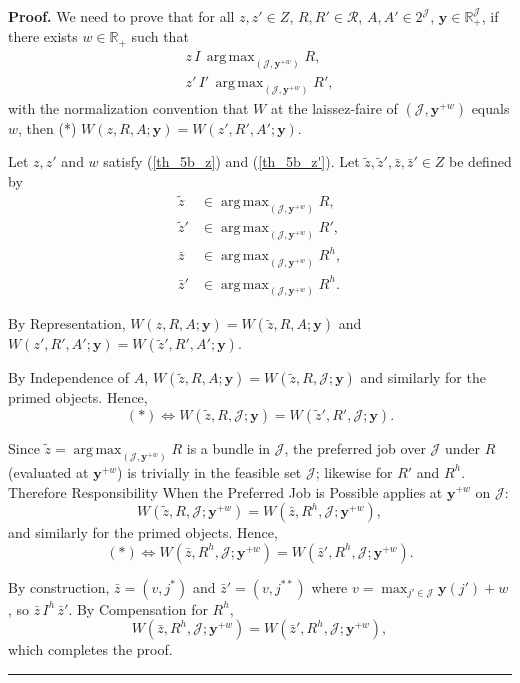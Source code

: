 \documentclass[12pt,thmsb]{article}
\DeclareMathOperator*{\argmax}{arg\,max}
\newenvironment{proof}[1][Proof]{\noindent \textbf{#1.} }{\  \rule{0.5em}{0.5em}}
\begin{document}
\begin{proof}
We need to prove that for all $z,z'\in Z$, $R,R'\in\mathcal{R}$, $A,A'\in 2^{\mathcal{J}}$, $\mathbf y\in\mathbb{R}_{+}^{\mathcal{J}}$, if there exists $w\in\mathbb{R}_{+}$ such that
\begin{align}
z\,I\,\argmax_{(\mathcal{J},\mathbf{y}^{+w})}R, \label{th_5b_z}\\
z'\,I'\,\argmax_{(\mathcal{J},\mathbf{y}^{+w})}R', \label{th_5b_z'}
\end{align}
with the normalization convention that $W$ at the laissez-faire of $(\mathcal J,\mathbf y^{+w})$ equals $w$, then (*) $W(z,R,A;\mathbf y)=W(z',R',A';\mathbf y)$.

Let $z,z'$ and $w$ satisfy (\ref{th_5b_z}) and (\ref{th_5b_z'}). Let $\tilde z,\tilde z',\bar z,\bar z'\in Z$ be defined by
\begin{align*}
\tilde z &\in \argmax_{(\mathcal J,\mathbf y^{+w})}R,\\
\tilde z' &\in \argmax_{(\mathcal J,\mathbf y^{+w})}R',\\
\bar z &\in \argmax_{(\mathcal J,\mathbf y^{+w})}R^h,\\
\bar z' &\in \argmax_{(\mathcal J,\mathbf y^{+w})}R^h.
\end{align*}

By Representation, $W(z,R,A;\mathbf y)=W(\tilde z,R,A;\mathbf y)$ and $W(z',R',A';\mathbf y)=W(\tilde z',R',A';\mathbf y)$.

By Independence of $A$, $W(\tilde z,R,A;\mathbf y)=W(\tilde z,R,\mathcal J;\mathbf y)$ and similarly for the primed objects. Hence,
\begin{equation*}
(*)\Leftrightarrow W(\tilde z,R,\mathcal J;\mathbf y)=W(\tilde z',R',\mathcal J;\mathbf y).
\end{equation*}

Since $\tilde z=\argmax_{(\mathcal J,\mathbf y^{+w})}R$ is a bundle in $\mathcal J$, the preferred job over $\mathcal J$ under $R$ (evaluated at $\mathbf y^{+w}$) is trivially in the feasible set $\mathcal J$; likewise for $R'$ and $R^h$. Therefore Responsibility When the Preferred Job is Possible applies at $\mathbf y^{+w}$ on $\mathcal J$:
\begin{equation*}
W(\tilde z,R,\mathcal J;\mathbf y^{+w})=W(\bar z,R^h,\mathcal J;\mathbf y^{+w}),
\end{equation*}
and similarly for the primed objects. Hence,
\begin{equation*}
(*)\Leftrightarrow W(\bar z,R^h,\mathcal J;\mathbf y^{+w})=W(\bar z',R^h,\mathcal J;\mathbf y^{+w}).
\end{equation*}

By construction, $\bar z=(v,j^*)$ and $\bar z'=(v,j^{**})$ where $v=\max_{j'\in\mathcal J}\mathbf y(j')+w$, so $\bar z\,I^h\,\bar z'$. By Compensation for $R^h$,
\begin{equation*}
W(\bar z,R^h,\mathcal J;\mathbf y^{+w})=W(\bar z',R^h,\mathcal J;\mathbf y^{+w}),
\end{equation*}
which completes the proof.
\end{proof}
\end{document}
